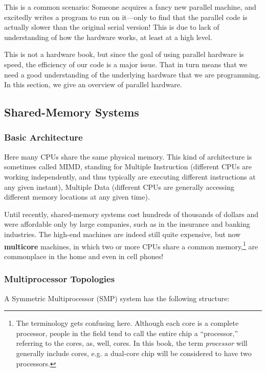 This is a common scenario:  Someone acquires a fancy new parallel
machine, and excitedly writes a program to run on it---only to find that
the parallel code is actually slower than the original serial version!
This is due to lack of understanding of how the hardware works, at least
at a high level.

This is not a hardware book, but since the goal of using parallel
hardware is speed, the efficiency of our code is a major issue.  That in
turn means that we need a good understanding of the underlying hardware
that we are programming.  In this section, we give an overview of
parallel hardware.

\subsection{Shared-Memory Systems}

\subsubsection{Basic Architecture}

Here many CPUs share the same physical memory.  This kind of
architecture is sometimes called MIMD, standing for Multiple Instruction
(different CPUs are working independently, and thus typically are
executing different instructions at any given instant), Multiple Data
(different CPUs are generally accessing different memory locations at
any given time).

Until recently, shared-memory systems cost hundreds of thousands of
dollars and were affordable only by large companies, such as in the
insurance and banking industries.  The high-end machines are indeed
still quite expensive, but now {\bf multicore} machines, in which two or
more CPUs share a common memory,\footnote{The terminology gets confusing
here.  Although each core is a complete processor, people in the field
tend to call the entire chip a ``processor,'' referring to the cores,
as, well, cores.  In this book, the term {\it processor} will generally
include cores, e.g. a dual-core chip will be considered to have two
processors.} are commonplace in the home and even in cell phones!

\subsubsection{Multiprocessor Topologies}

A Symmetric Multiprocessor (SMP) system has the following structure:



